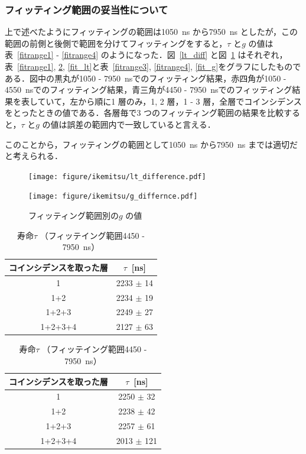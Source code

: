 \subsubsection{フィッティング範囲の妥当性について}
上で述べたようにフィッティングの範囲は1050~ns から7950~ns としたが，この範囲の前側と後側で範囲を分けてフィッティングをすると，$\tau$ と$g$ の値は表~\ref{fitrange1} - \ref{fitrange4} のようになった．図~\ref{lt_diff} と図~\ref{g_diff} はそれぞれ，表~\ref{fitrange1}, \ref{fitrange2}, \ref{fit_lt}と表~\ref{fitrange3}, \ref{fitrange4}, \ref{fit_g}をグラフにしたものである．図中の黒丸が1050 - 7950~nsでのフィッティング結果，赤四角が1050 - 4550~nsでのフィッティング結果，青三角が4450 - 7950~nsでのフィッティング結果を表していて，左から順に1 層のみ，1, 2 層，1 - 3 層，全層でコインシデンスをとったときの値である．各層毎で3 つのフィッティング範囲の結果を比較すると，$\tau$ と$g$ の値は誤差の範囲内で一致していると言える．
  
このことから，フィッティングの範囲として1050~ns から7950~ns までは適切だと考えられる．

\begin{figure}[H]
\centering
\begin{minipage}{0.4\columnwidth}
\centering
\texttt{[image: figure/ikemitsu/lt\_difference.pdf]}
\caption{フィッティング範囲別の寿命の値}
\label{lt_diff}
\end{minipage}
\begin{minipage}{0.4\columnwidth}
\centering
\texttt{[image: figure/ikemitsu/g\_differnce.pdf]}
\caption{フィッティング範囲別の$g$ の値}
\label{g_diff}
\end{minipage}
\end{figure}
  
\begin{table}[H]
\centering
\begin{minipage}{0.4\columnwidth}
\caption{寿命$\tau$ （フィッティング範囲1050 - 4550~ns） }
\label{fitrange1}
\centering
\begin{tabular}{cc}\toprule
コインシデンスを取った層 & $\tau$~[ns] \\ \midrule
1 & 2233 $\pm$ 14 \\
1+2 & 2234 $\pm$ 19 \\
1+2+3 & 2249 $\pm$ 27 \\
1+2+3+4 & 2127 $\pm$ 63 \\ \bottomrule
\end{tabular}
\end{minipage}
\hspace*{5mm}
\begin{minipage}{0.4\columnwidth}
\caption{寿命$\tau$ （フィッテイング範囲4450 - 7950~ns） }
\label{fitrange2}
\centering
\begin{tabular}{cc}\toprule
コインシデンスを取った層 & $\tau$~[ns] \\ \midrule
1 & 2250 $\pm$ 32 \\
1+2 & 2238 $\pm$ 42 \\
1+2+3 & 2257 $\pm$ 61 \\
1+2+3+4 & 2013 $\pm$ 121 \\ \bottomrule
\end{tabular}
\end{minipage}
\end{table}%

